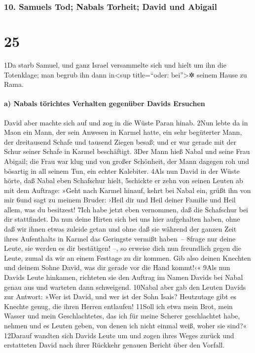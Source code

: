 \hypertarget{samuels-tod-nabals-torheit-david-und-abigail}{%
\subsubsection{10. Samuels Tod; Nabals Torheit; David und
Abigail}\label{samuels-tod-nabals-torheit-david-und-abigail}}

\hypertarget{section-24}{%
\section{25}\label{section-24}}

1Da starb Samuel, und ganz Israel versammelte sich und hielt um ihn die
Totenklage; man begrub ihn dann in\textless sup title=``oder:
bei''\textgreater✲ seinem Hause zu Rama.

\hypertarget{a-nabals-tuxf6richtes-verhalten-gegenuxfcber-davids-ersuchen}{%
\paragraph{a) Nabals törichtes Verhalten gegenüber Davids
Ersuchen}\label{a-nabals-tuxf6richtes-verhalten-gegenuxfcber-davids-ersuchen}}

David aber machte sich auf und zog in die Wüste Paran hinab. 2Nun lebte
da in Maon ein Mann, der sein Anwesen in Karmel hatte, ein sehr
begüterter Mann, der dreitausend Schafe und tausend Ziegen besaß; und er
war gerade mit der Schur seiner Schafe in Karmel beschäftigt. 3Der Mann
hieß Nabal und seine Frau Abigail; die Frau war klug und von großer
Schönheit, der Mann dagegen roh und bösartig in all seinem Tun, ein
echter Kalebiter. 4Als nun David in der Wüste hörte, daß Nabal eben
Schafschur hielt, 5schickte er zehn von seinen Leuten ab mit dem
Auftrage: »Geht nach Karmel hinauf, kehrt bei Nabal ein, grüßt ihn von
mir 6und sagt zu meinem Bruder: ›Heil dir und Heil deiner Familie und
Heil allem, was du besitzest! 7Ich habe jetzt eben vernommen, daß die
Schafschur bei dir stattfindet. Da nun deine Hirten sich bei uns hier
aufgehalten haben, ohne daß wir ihnen etwas zuleide getan und ohne daß
sie während der ganzen Zeit ihres Aufenthalts in Karmel das Geringste
vermißt haben~-- 8frage nur deine Leute, sie werden es dir bestätigen!
--, so erweise dich nun freundlich gegen die Leute, zumal da wir an
einem Festtage zu dir kommen. Gib also deinen Knechten und deinem Sohne
David, was dir gerade vor die Hand kommt!‹« 9Als nun Davids Leute
hinkamen, richteten sie den Auftrag im Namen Davids bei Nabal genau aus
und warteten dann schweigend. 10Nabal aber gab den Leuten Davids zur
Antwort: »Wer ist David, und wer ist der Sohn Isais? Heutzutage gibt es
Knechte genug, die ihren Herren entlaufen! 11Soll ich etwa mein Brot,
mein Wasser und mein Geschlachtetes, das ich für meine Scherer
geschlachtet habe, nehmen und es Leuten geben, von denen ich nicht
einmal weiß, woher sie sind?« 12Darauf wandten sich Davids Leute um und
zogen ihres Weges zurück und erstatteten David nach ihrer Rückkehr
genauen Bericht über den Vorfall.

